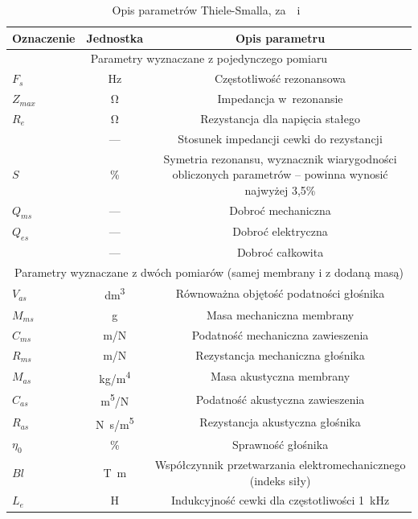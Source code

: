 \documentclass[12pt]{oska}
\begin{document}
	\begin{table}[!ht]
		\centering
		\caption{Opis parametrów Thiele-Smalla, za~\cite{BK_pulse_TS}~i~\cite{dobrucki}}
		\label{t:TS_opis}
		\begin{tabular}{|l|c|c|}
			\hline
			\textbf{Oznaczenie} & \textbf{Jednostka} & \textbf{Opis parametru}\\\hline\hline
			\multicolumn{3}{|c|}{Parametry wyznaczane z pojedynczego pomiaru} \\\hline\hline
			$F_s$ & \si{\hertz} & Częstotliwość rezonansowa \\\hline
			$Z_{max}$ & \si{\ohm} & Impedancja w~rezonansie \\\hline
			$R_e$ & \si{\ohm} & Rezystancja dla napięcia stałego \\\hline
			\gape{$r_0=\frac{Z_{max}}{R_e}$} & --- & Stosunek impedancji cewki do rezystancji \\\hline
			$S$ & \% & \makecell{Symetria rezonansu, wyznacznik wiarygodności\\obliczonych parametrów -- powinna wynosić najwyżej 3,5\%} \\\hline
			\hline
			$Q_{ms}$ & --- & Dobroć mechaniczna \\\hline
			$Q_{es}$ & --- & Dobroć elektryczna \\\hline
			\gape{$Q_{ts}=\frac{Q_{ms}\cdot Q_{es}}{Q_{ms}+Q_{es}}$} & --- & Dobroć całkowita \\\hline
			\hline
			\multicolumn{3}{|c|}{Parametry wyznaczane z dwóch pomiarów (samej membrany i z dodaną masą)} \\\hline\hline
			$V_{as}$ & \si{\deci\metre\cubed} & Równoważna objętość podatności głośnika \\\hline
			$M_{ms}$ & \si{\gram} & Masa mechaniczna membrany \\\hline
			$C_{ms}$ & \si[per-mode=symbol]{\metre\per\newton} & Podatność mechaniczna zawieszenia \\\hline
			$R_{ms}$ & \si[per-mode=symbol]{\metre\per\newton} & Rezystancja mechaniczna głośnika \\\hline
			\hline
			$M_{as}$ & \si[per-mode=symbol]{\kilo\gram\per\metre\tothe{4}} & Masa akustyczna membrany \\\hline
			$C_{as}$ & \si[per-mode=symbol]{\metre\tothe{5}\per\newton} & Podatność akustyczna zawieszenia \\\hline
			$R_{as}$ & \si[per-mode=symbol]{\newton\s\per\metre\tothe{5}} & Rezystancja akustyczna głośnika \\\hline
			\hline
			$\eta_0$ & \% & Sprawność głośnika \\\hline
			$Bl$ & \si{\tesla\metre} & \makecell{Współczynnik przetwarzania elektromechanicznego\\(indeks siły)} \\\hline
			$L_{e}$ & \si{\henry} & Indukcyjność cewki dla częstotliwości \SI{1}{\kilo\hertz} \\\hline
		\end{tabular}
	\end{table}
	
\end{document}
